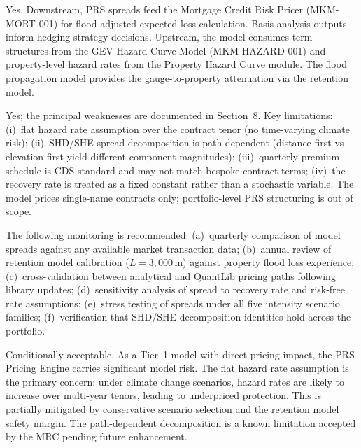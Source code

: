 \documentclass[11pt,a4paper]{article}
\begin{document}
Yes. Downstream, PRS spreads feed the Mortgage Credit Risk Pricer (MKM-MORT-001) for flood-adjusted expected loss calculation. Basis analysis outputs inform hedging strategy decisions. Upstream, the model consumes term structures from the GEV Hazard Curve Model (MKM-HAZARD-001) and property-level hazard rates from the Property Hazard Curve module. The flood propagation model provides the gauge-to-property attenuation via the retention model.

Yes; the principal weaknesses are documented in Section~8. Key limitations: (i)~flat hazard rate assumption over the contract tenor (no time-varying climate risk); (ii)~SHD/SHE spread decomposition is path-dependent (distance-first vs elevation-first yield different component magnitudes); (iii)~quarterly premium schedule is CDS-standard and may not match bespoke contract terms; (iv)~the recovery rate is treated as a fixed constant rather than a stochastic variable. The model prices single-name contracts only; portfolio-level PRS structuring is out of scope.

The following monitoring is recommended: (a)~quarterly comparison of model spreads against any available market transaction data; (b)~annual review of retention model calibration ($L = 3{,}000$\,m) against property flood loss experience; (c)~cross-validation between analytical and QuantLib pricing paths following library updates; (d)~sensitivity analysis of spread to recovery rate and risk-free rate assumptions; (e)~stress testing of spreads under all five intensity scenario families; (f)~verification that SHD/SHE decomposition identities hold across the portfolio.

Conditionally acceptable. As a Tier~1 model with direct pricing impact, the PRS Pricing Engine carries significant model risk. The flat hazard rate assumption is the primary concern: under climate change scenarios, hazard rates are likely to increase over multi-year tenors, leading to underpriced protection. This is partially mitigated by conservative scenario selection and the retention model safety margin. The path-dependent decomposition is a known limitation accepted by the MRC pending future enhancement.

\clearpage
\end{document}

